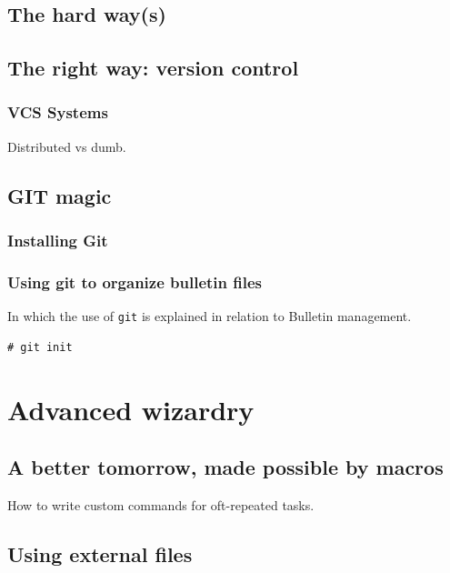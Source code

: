 \documentclass[12pt]{scrartcl}
\begin{document}
\subsection{The hard way(s)}

\subsection{The right way: version control}

\subsubsection{VCS Systems}


Distributed vs dumb.

\subsection{GIT magic}

\subsubsection{Installing Git}
\label{sec:gitinstall}

\subsubsection{Using git to organize bulletin files}

In which the use of \texttt{git} is explained in relation to Bulletin
management.

\begin{verbatim}
# git init
\end{verbatim}

\section{Advanced wizardry}

\subsection{A better tomorrow, made possible by macros}

How to write custom commands for oft-repeated tasks.

\subsection{Using external files}
\end{document}
